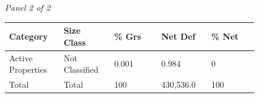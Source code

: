 \documentclass[12pt]{article}
\begin{document}
\begin{landscape}
\begin{table}[H]
\vspace{0.6em}

\textit{Panel 2 of 2}\\[2pt]
{\fontsize{12}{14}\selectfont
\setlength{\tabcolsep}{3pt}
\renewcommand{\arraystretch}{1.08}
\begin{tabular}{p{0.164\linewidth}p{0.164\linewidth}p{0.164\linewidth}p{0.164\linewidth}p{0.164\linewidth}}
\toprule
Category & Size Class & \% Grs & Net Def & \% Net \\
\midrule
Active Properties & Not Classified & 0.001 & 0.984 & 0 \\
Total & Total & 100 & 430,536.0 & 100 \\
\bottomrule
\end{tabular}
}
\end{table}
\end{landscape}
\end{document}
